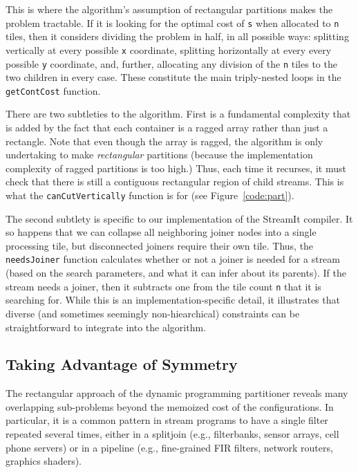 This is where the algorithm's assumption of rectangular partitions
makes the problem tractable.  If it is looking for the optimal cost of
{\tt s} when allocated to {\tt n} tiles, then it considers dividing
the problem in half, in all possible ways: splitting vertically at
every possible {\tt x} coordinate, splitting horizontally at every
every possible {\tt y} coordinate, and, further, allocating any
division of the {\tt n} tiles to the two children in every case.
These constitute the main triply-nested loops in the {\tt getContCost}
function.

There are two subtleties to the algorithm.  First is a fundamental
complexity that is added by the fact that each container is a ragged
array rather than just a rectangle.  Note that even though the array
is ragged, the algorithm is only undertaking to make {\it rectangular}
partitions (because the implementation complexity of ragged partitions
is too high.)  Thus, each time it recurses, it must check that there
is still a contiguous rectangular region of child streams.  This is
what the {\tt canCutVertically} function is for (see
Figure~\ref{code:part}).

The second subtlety is specific to our implementation of the StreamIt
compiler.  It so happens that we can collapse all neighboring joiner
nodes into a single processing tile, but disconnected joiners require
their own tile.  Thus, the {\tt needsJoiner} function calculates
whether or not a joiner is needed for a stream (based on the search
parameters, and what it can infer about its parents).  If the stream
needs a joiner, then it subtracts one from the tile count {\tt n} that
it is searching for.  While this is an implementation-specific detail,
it illustrates that diverse (and sometimes seemingly non-hiearchical)
constraints can be straightforward to integrate into the algorithm.

\subsection{Taking Advantage of Symmetry}

The rectangular approach of the dynamic programming partitioner
reveals many overlapping sub-problems beyond the memoized cost of the
configurations.  In particular, it is a common pattern in stream
programs to have a single filter repeated several times, either in a
splitjoin (e.g., filterbanks, sensor arrays, cell phone servers) or in
a pipeline (e.g., fine-grained FIR filters, network routers, graphics
shaders).  

